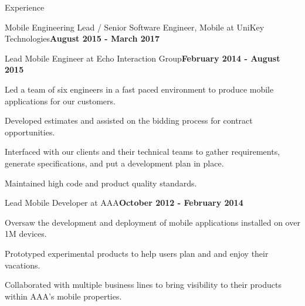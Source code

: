 \documentclass{resume} %
\begin{document}
\begin{rSection}{Experience}
\begin{rSubsection}{Mobile Engineering Lead / Senior Software Engineer, Mobile at UniKey Technologies}{\bf August 2015 - March 2017}{}{}
    \end{rSubsection}


    \begin{rSubsection}{Lead Mobile Engineer at Echo Interaction Group}{\bf February 2014 - August 2015}{}{}

    \item Led a team of six engineers in a fast paced environment to produce mobile applications for our customers.
    \item Developed estimates and assisted on the bidding process for contract opportunities.
    \item Interfaced with our clients and their technical teams to gather requirements, generate specifications, and put a development plan in place.
    \item Maintained high code and product quality standards.


    \end{rSubsection}


    \begin{rSubsection}{Lead Mobile Developer at AAA}{\bf October 2012 - February 2014}{}{}

    \item Oversaw the development and deployment of mobile applications installed on over 1M devices.
    \item Prototyped experimental products to help users plan and and enjoy their vacations.
    \item Collaborated with multiple business lines to bring visibility to their products within AAA's mobile properties.

    \end{rSubsection}


\end{rSection}

\end{document}
